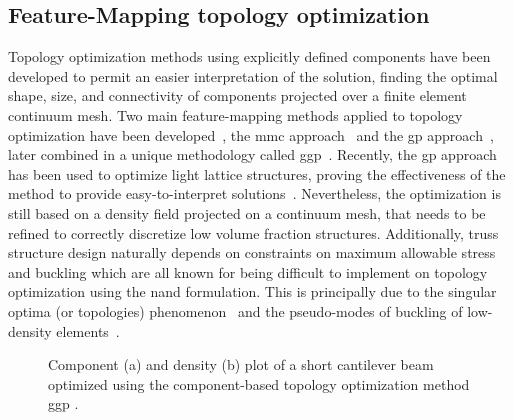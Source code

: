 \subsection{Feature-Mapping topology optimization}
Topology optimization methods using explicitly defined components have been developed to permit an easier interpretation of the solution, finding the optimal shape, size, and connectivity of components projected over a finite element continuum mesh. Two main feature-mapping methods applied to topology optimization have been developed~, the \gls{mmc} approach~
and the \gls{gp} approach~, later combined in a unique methodology called \gls{ggp}~. Recently, the \gls{gp} approach has been used to optimize light lattice structures, proving the effectiveness of the method to provide easy-to-interpret solutions~. Nevertheless, the optimization is still based on a density field projected on a continuum mesh, that needs to be refined to correctly discretize low volume fraction structures. Additionally, truss structure design naturally depends on constraints on maximum allowable stress and buckling which are all known for being difficult to implement on topology optimization using the \gls{nand} formulation. This is principally due to the singular optima (or topologies) phenomenon~ and the pseudo-modes of buckling of low-density elements~. \begin{figure}
    \hspace*{\fill}
    \hfill
    \hspace*{\fill}
    \caption{Component (a) and density (b) plot of a short cantilever beam optimized using the component-based topology optimization method \gls{ggp} \cite{coniglio_generalized_2020}.}
    \label{fig:03_to_plot}
\end{figure}

